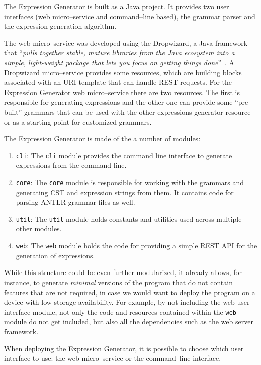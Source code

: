 \documentclass[]{usiinfbachelorproject}
\begin{document}
The Expression Generator is built as a Java project. It provides two user
interfaces (web micro–service and command–line based), the grammar parser and
the expression generation algorithm.

The web micro–service was developed using the Dropwizard, a Java framework
that ``\textit{pulls together stable, mature libraries from the Java ecosystem
into a simple, light-weight package that lets you focus on getting things
done}''~\cite{webdropwizard}. A Dropwizard micro–service provides some
resources, which are building blocks associated with an URI template that
can handle REST requests. For the Expression Generator web micro–service
there are two resources. The first is responsible for generating expressions
and the other one can provide some ``pre–built'' grammars that can be used
with the other expressions generator resource or as a starting point for
customized grammars.

The Expression Generator is made of the a number of modules:

\begin{enumerate}
\item \texttt{cli}: The \texttt{cli} module provides the command line interface
      to generate expressions from the command line.
\item \texttt{core}: The \texttt{core} module is responsible for working
      with the grammars and generating CST and expression strings from them.
      It contains code for parsing ANTLR grammar files as well.
\item \texttt{util}: The \texttt{util} module holds constants and utilities
      used across multiple other modules.
\item \texttt{web}: The \texttt{web} module holds the code for providing a
      simple REST API for the generation of expressions.
\end{enumerate}

While this structure could be even further modularized, it already allows, for
instance, to generate \textit{minimal} versions of the program that do
not contain features that are not required, in case we would want to deploy the
program on a device with low storage availability. For example, by not
including the web user interface module, not only the code and resources
contained within the \texttt{web} module do not get included, but also all the
dependencies such as the web server framework.

When deploying the Expression Generator, it is possible to choose which user
interface to use: the web micro–service or the command–line interface.
\end{document}
